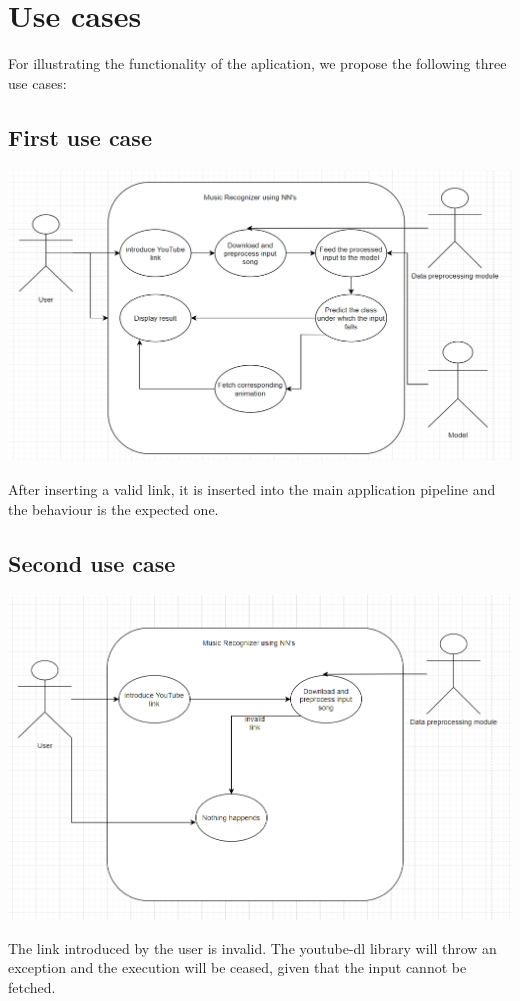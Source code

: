\chapter{Use cases}

For illustrating the functionality of the aplication, we propose the following three use cases:

\section{First use case}

\begin{center}
	\centering
	\includegraphics[width = 5.5in]{images/usecase1.png}
	\centerline{}
	\label{uc1}
	\end{center}
After inserting a valid link, it is inserted into the main application pipeline and the
behaviour is the expected one.
\section{Second use case}
\begin{center}
	\centering
	\includegraphics[width = 5.5in]{images/usecase3.png}
	\centerline{}
	\label{uc3}
	\end{center}
The link introduced by the user is invalid. The youtube-dl library will throw an exception and the execution will be ceased, given that the input cannot be fetched.

